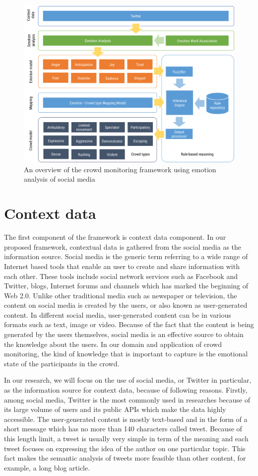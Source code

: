 \begin{figure}[htb!] 
\centering    
\includegraphics[width=1.0\textwidth]{FrameworkOverview}
\caption{An overview of the crowd monitoring framework using emotion analysis of social media}
\label{fig:frameworkOverview}
\end{figure}

\section{Context data}
The first component of the framework is context data component. In our proposed framework, contextual data is gathered from the social media as the information source. Social media is the generic term referring to a wide range of Internet based tools that enable an user to create and share information with each other. These tools include social network services such as Facebook and Twitter, blogs, Internet forums and channels which has marked the beginning of Web 2.0. Unlike other traditional media such as newspaper or television, the content on social media is created by the users, or also known as user-generated content. In different social media, user-generated content can be in various formats such as text, image or video. Because of the fact that the content is being generated by the users themselves, social media is an effective source to obtain the knowledge about the users. In our domain and application of crowd monitoring, the kind of knowledge that is important to capture is the emotional state of the participants in the crowd. 

In our research, we will focus on the use of social media, or Twitter in particular, as the information source for context data, because of following reasons. Firstly, among social media, Twitter is the most commonly used in researches because of its large volume of users and its public APIs which make the data highly accessible. The user-generated content is mostly text-based and in the form of a short message which has no more than 140 characters called tweet. Because of this length limit, a tweet is usually very simple in term of the meaning and each tweet focuses on expressing the idea of the author on one particular topic. This fact makes the semantic analysis of tweets more feasible than other content, for example, a long blog article.

